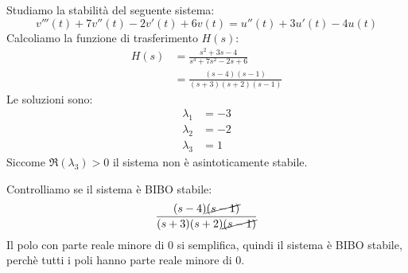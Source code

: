 \documentclass[a4paper]{article}
\begin{document}
\begin{example}
  Studiamo la stabilità del seguente sistema:
  \[
    v'''(t) + 7v''(t) - 2v'(t) + 6v(t) = u''(t) + 3u'(t) - 4u(t)
  \] 
  Calcoliamo la funzione di trasferimento \( H(s) \):
  \[
  \begin{aligned}
    H(s) &= \frac{s^2 + 3s - 4}{s^3 + 7s^2 - 2s + 6}\\
         &= \frac{(s-4)(s-1)}{(s+3)(s+2)(s-1)}
  \end{aligned}
  \] 
  Le soluzioni sono:
  \[
  \begin{aligned}
    \lambda_1 &= -3\\
    \lambda_2 &= -2\\
    \lambda_3 &= 1
  \end{aligned}
  \]
  Siccome \( \Re(\lambda_3) > 0 \) il sistema non è asintoticamente stabile.

  \vspace{1em}
  \noindent
  Controlliamo se il sistema è BIBO stabile:
  \[
    \frac{(s-4)\cancel{(s-1)}}{(s+3)(s+2)\cancel{(s-1)}}
  \] 
  Il polo con parte reale minore di 0 si semplifica, quindi il sistema è BIBO stabile,
  perchè tutti i poli hanno parte reale minore di 0.
\end{example}
\end{document}
